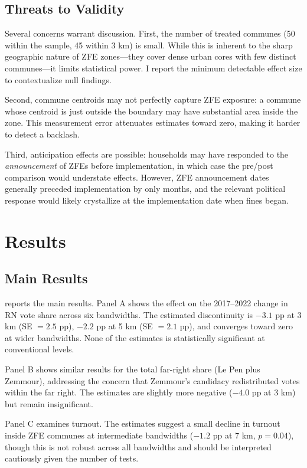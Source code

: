 \documentclass[12pt]{article}
\begin{document}
\subsection{Threats to Validity}

Several concerns warrant discussion. First, the number of treated communes (50 within the sample, 45 within 3 km) is small. While this is inherent to the sharp geographic nature of ZFE zones---they cover dense urban cores with few distinct communes---it limits statistical power. I report the minimum detectable effect size to contextualize null findings.

Second, commune centroids may not perfectly capture ZFE exposure: a commune whose centroid is just outside the boundary may have substantial area inside the zone. This measurement error attenuates estimates toward zero, making it harder to detect a backlash.

Third, anticipation effects are possible: households may have responded to the \textit{announcement} of ZFEs before implementation, in which case the pre/post comparison would understate effects. However, ZFE announcement dates generally preceded implementation by only months, and the relevant political response would likely crystallize at the implementation date when fines began.

\section{Results}

\subsection{Main Results}



 reports the main results. Panel A shows the effect on the 2017--2022 change in RN vote share across six bandwidths. The estimated discontinuity is $-3.1$ pp at 3 km (SE $= 2.5$ pp), $-2.2$ pp at 5 km (SE $= 2.1$ pp), and converges toward zero at wider bandwidths. None of the estimates is statistically significant at conventional levels.

Panel B shows similar results for the total far-right share (Le Pen plus Zemmour), addressing the concern that Zemmour's candidacy redistributed votes within the far right. The estimates are slightly more negative ($-4.0$ pp at 3 km) but remain insignificant.

Panel C examines turnout. The estimates suggest a small decline in turnout inside ZFE communes at intermediate bandwidths ($-1.2$ pp at 7 km, $p = 0.04$), though this is not robust across all bandwidths and should be interpreted cautiously given the number of tests.
\end{document}
